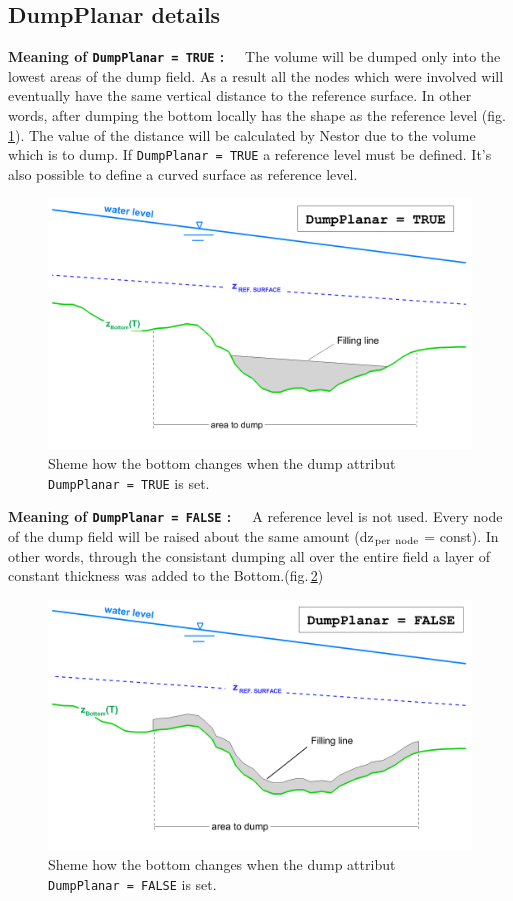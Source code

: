 \subsection{DumpPlanar details}\label{ssec:DumpPlanar}
\label{txt:DumpPlanar}
%
\textbf{Meaning of \texttt{DumpPlanar = TRUE} :}~~~The volume will be dumped only into the
lowest areas of the dump field. As a result all the nodes which were involved
will eventually have the same vertical distance to the reference surface.
In other words, after dumping the bottom locally has the shape as the reference level (fig.\,\ref{E4PlanT}).
The value of the distance will be calculated by Nestor due to the volume which is to dump.
If \texttt{DumpPlanar\,=\,TRUE} a reference level must be defined.
It's also possible to define a curved surface as reference level.
\begin{figure} [H]
 \centering
 \includegraphics[scale=0.12]{img/Schema_DumpPlanar-true.png}
 \caption{Sheme how the bottom changes when the dump attribut \texttt{DumpPlanar\,=\,TRUE} is set.}
 \label{E4PlanT}
\end{figure}
%
\newpage
\textbf{Meaning of \texttt{DumpPlanar = FALSE} :}~~~A reference level is not used. Every node of
the dump field will be raised about the same amount (dz$_{\rm{per~node}}$ = const).
In other words, through the consistant dumping all over the entire field a layer of constant thickness
was added to the Bottom.(fig.\,\ref{E4PlanF})
\begin{figure} [H]
 \centering
 \includegraphics[scale=0.12]{img/Schema_DumpPlanar-false.png}
 \caption{Sheme how the bottom changes when the dump attribut \texttt{DumpPlanar\,=\,FALSE} is set.}
 \label{E4PlanF}
\end{figure}

